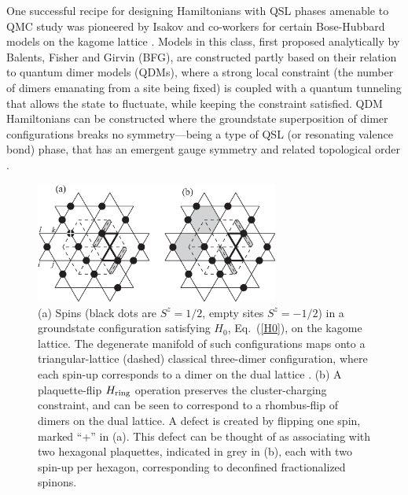 \documentclass[10pt,pre,aps,twocolumn,showpacs,superscriptaddress,floatfix]{revtex4-1}
\begin{document}
One successful recipe for designing Hamiltonians with QSL phases amenable to QMC study was pioneered by Isakov and co-workers for certain Bose-Hubbard models on the kagome 
lattice \cite{Isakov1, Isakov2, TopoEE}.  Models in this class, first proposed analytically by Balents, Fisher and Girvin \cite{BFG} (BFG), are constructed partly based on their 
relation to quantum dimer models (QDMs), where a strong local constraint (the number of dimers emanating from a site being fixed) is coupled with a quantum tunneling that allows 
the state to fluctuate, while keeping the constraint satisfied. QDM Hamiltonians can be constructed where the groundstate superposition of dimer configurations breaks no 
symmetry---being a type of QSL (or resonating valence bond) phase, that has an emergent gauge symmetry and related topological order \cite{Misguich1}.

\begin{figure}
\includegraphics[width=8cm, clip]{fig09.eps}
\caption{ (a) Spins (black dots are $S^z = 1/2$, empty sites $S^z = -1/2$) in a groundstate configuration satisfying $H_0$, Eq.~(\ref{H0}), on the kagome lattice.  
The degenerate manifold of such configurations maps onto a triangular-lattice (dashed) classical three-dimer configuration, where each spin-up corresponds to a dimer 
on the dual lattice \cite{BFG}. (b) A plaquette-flip $H_{\rm ring}$ operation preserves the cluster-charging constraint, and can be seen to correspond 
to a rhombus-flip of dimers on the dual lattice.  A defect is created by flipping one spin, marked ``+'' in (a).  This defect can be thought of as associating with 
two hexagonal plaquettes, indicated in grey in (b), each with two spin-up per hexagon, corresponding to deconfined fractionalized spinons.} \label{kag_fig}
\end{figure}
\end{document}
